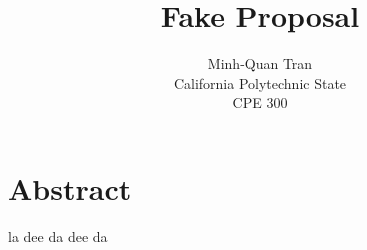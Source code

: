 

\title{Fake Proposal}
\author{Minh-Quan Tran\\
California Polytechnic State\\
CPE 300}
\maketitle


\section{Abstract}

la dee da dee da


\pagebreak
\tableofcontents
\pagebreak